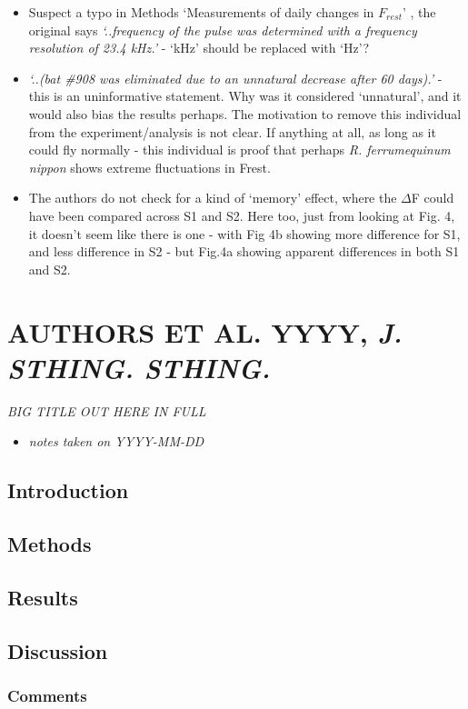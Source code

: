 \documentclass[
]{book}
\providecommand{\tightlist}{%
  \setlength{\itemsep}{0pt}\setlength{\parskip}{0pt}}
\begin{document}
\begin{itemize}
\tightlist
\item
  Suspect a typo in Methods `Measurements of daily changes in \(F_{rest}\)' , the original says \emph{`..frequency of the pulse was determined with a frequency resolution of 23.4 kHz.'} - `kHz' should be replaced with `Hz'?
\item
  \emph{`..(bat \#908 was eliminated due to an unnatural decrease after 60 days).'} - this is an uninformative statement. Why was it considered `unnatural', and it would also bias the results perhaps. The motivation to remove this individual from the experiment/analysis is not clear. If anything at all, as long as it could fly normally - this individual is proof that perhaps \emph{R. ferrumequinum nippon} shows extreme fluctuations in Frest.
\item
  The authors do not check for a kind of `memory' effect, where the \(\Delta\)F could have been compared across S1 and S2. Here too, just from looking at Fig. 4, it doesn't seem like there is one - with Fig 4b showing more difference for S1, and less difference in S2 - but Fig.4a showing apparent differences in both S1 and S2.
\end{itemize}

\hypertarget{authors-et-al.-yyyy-j.-sthing.-sthing.}{%
\chapter{\texorpdfstring{AUTHORS ET AL. YYYY, \emph{J. STHING. STHING.}}{AUTHORS ET AL. YYYY, J. STHING. STHING.}}\label{authors-et-al.-yyyy-j.-sthing.-sthing.}}


\emph{BIG TITLE OUT HERE IN FULL} \citep{schuchmannsiemers2010a}

\begin{itemize}
\tightlist
\item
  \emph{notes taken on YYYY-MM-DD}
\end{itemize}

\hypertarget{introduction-16}{%
\section{Introduction}\label{introduction-16}}

\hypertarget{methods-14}{%
\section{Methods}\label{methods-14}}

\hypertarget{results-15}{%
\section{Results}\label{results-15}}

\hypertarget{discussion-10}{%
\section{Discussion}\label{discussion-10}}

\hypertarget{comments-14}{%
\subsection{Comments}\label{comments-14}}

  
\end{document}
